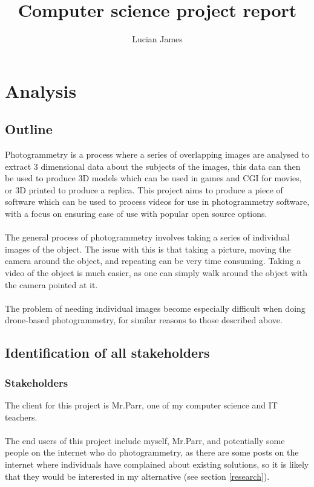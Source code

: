 \documentclass[11pt]{report}
\title{Computer science project report}
\author{Lucian James}
\begin{document}
\maketitle
\tableofcontents
\thispagestyle{fancy}


\chapter{Analysis}
\thispagestyle{fancy}
\section{Outline} %
Photogrammetry is a process where a series of overlapping images are analysed to extract 3 dimensional data about the subjects of the images, this data can then be used to produce 3D models which can be used in games and CGI for movies, or 3D printed to produce a replica.
This project aims to produce a piece of software which can be used to process videos for use in photogrammetry software, with a focus on ensuring ease of use with popular open source options.\\\\
The general process of photogrammetry involves taking a series of individual images of the object.
The issue with this is that taking a picture, moving the camera around the object, and repeating can be very time consuming.
Taking a video of the object is much easier, as one can simply walk around the object with the camera pointed at it.\\\\
The problem of needing individual images become especially difficult when doing drone-based photogrammetry, for similar reasons to those described above.

\section{Identification of all stakeholders}

\subsection{Stakeholders}
The client for this project is Mr.Parr, one of my computer science and IT teachers.\\\\
The end users of this project include myself, Mr.Parr, and potentially some people on the internet who do photogrammetry, as there are some posts on the internet where individuals have complained about existing solutions, so it is likely that they would be interested in my alternative (see section \ref{research}).
\end{document}

